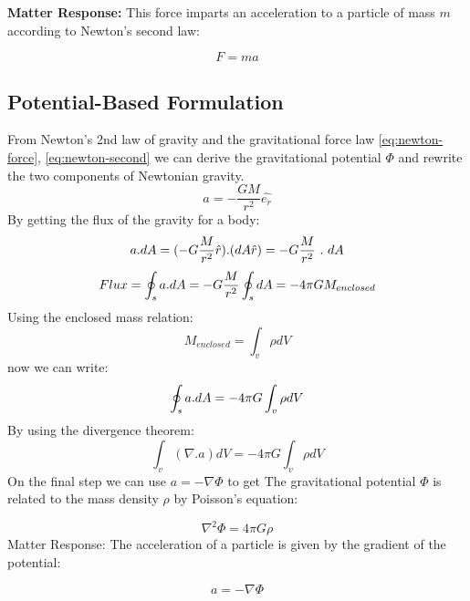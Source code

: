 \documentclass[11pt, a4paper]{report}
\newcommand{\eqn}[1]{\hyperref[#1]{\eqref{#1}}}
\begin{document}
\textbf{Matter Response:} This force imparts an acceleration to a particle of mass $m$ according to Newton's second law:

\begin{equation}\label{eq:newton-second}
    F = ma
\end{equation}

\subsection*{Potential-Based Formulation}
From Newton's 2nd law of gravity and the gravitational force law \eqn{eq:newton-force}, \eqn{eq:newton-second} we can derive the gravitational potential $\Phi$ and rewrite the two components of Newtonian gravity.
\begin{equation}
    a = -\frac{GM}{r^2} \hat{e_r}
\end{equation}
By getting the flux of the gravity for a body:
$$a.dA = (-G \frac{M}{r^2} \space \hat{r}).(dA \space \space \hat{r}) = -G \frac{M}{r^2}\ . \ dA$$
$$Flux  = \oint_s a \space . \space dA = - G \frac{M}{r^2} \oint_s dA = - 4 \pi G M_{enclosed}$$
Using the enclosed mass relation:
$$M_{enclosed} = \int_v \rho dV$$
now we can write: 
$$\oint_s a \space . \space dA = - 4 \pi G \int_v \rho dV$$
By using the divergence theorem:
$$\int_v (\nabla . a) dV = - 4 \pi G \int_v \rho dV$$
On the final step we can use $a = - \nabla \Phi$ to get The gravitational potential $\Phi$ is related to the mass density $\rho$ by Poisson's equation:

\begin{equation}\label{eq:poisson}
    \nabla^2 \Phi = 4\pi G \rho
\end{equation}
Matter Response: The acceleration of a particle is given by the gradient of the potential:

\begin{equation}\label{eq:potential-accel}
    a = -\nabla \Phi
\end{equation}
\end{document}
